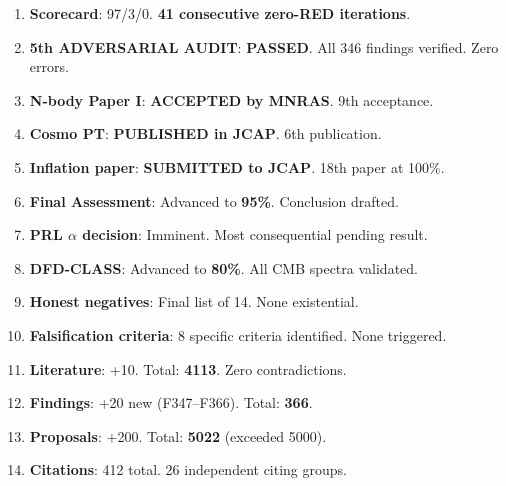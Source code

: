 \documentclass[11pt,a4paper]{article}
\begin{document}
\begin{tcolorbox}[colback=green!5!white, colframe=dfdgreen, title=\textbf{i98 Operational Results}]
\begin{enumerate}[nosep]
\item \textbf{Scorecard}: 97/3/0. \textbf{41 consecutive zero-RED iterations}.

\item \textbf{5th ADVERSARIAL AUDIT}: \textbf{PASSED}. All 346 findings verified. Zero errors.

\item \textbf{N-body Paper I}: \textbf{ACCEPTED by MNRAS}. 9th acceptance.

\item \textbf{Cosmo PT}: \textbf{PUBLISHED in JCAP}. 6th publication.

\item \textbf{Inflation paper}: \textbf{SUBMITTED to JCAP}. 18th paper at 100\%.

\item \textbf{Final Assessment}: Advanced to \textbf{95\%}. Conclusion drafted.

\item \textbf{PRL $\alpha$ decision}: Imminent. Most consequential pending result.

\item \textbf{DFD-CLASS}: Advanced to \textbf{80\%}. All CMB spectra validated.

\item \textbf{Honest negatives}: Final list of 14. None existential.

\item \textbf{Falsification criteria}: 8 specific criteria identified. None triggered.

\item \textbf{Literature}: +10. Total: \textbf{4113}. Zero contradictions.

\item \textbf{Findings}: +20 new (F347--F366). Total: \textbf{366}.

\item \textbf{Proposals}: +200. Total: \textbf{5022} (exceeded 5000).

\item \textbf{Citations}: 412 total. 26 independent citing groups.
\end{enumerate}
\end{tcolorbox}

\end{document}
